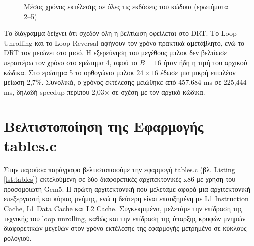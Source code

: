 \documentclass[12pt]{article}
\begin{document}
\begin{figure}[H]
\centering
{}
\caption{Μέσος χρόνος εκτέλεσης σε όλες τις εκδόσεις του κώδικα (ερωτήματα 2--5)}
\label{fig:summary}
\end{figure}

Το διάγραμμα δείχνει ότι σχεδόν όλη η βελτίωση οφείλεται στο DRT. Το Loop Unrolling και το Loop Reversal αφήνουν τον χρόνο πρακτικά αμετάβλητο, ενώ το DRT τον μειώνει στο μισό. Η εξερεύνηση του μεγέθους μπλοκ δεν βελτίωσε περαιτέρω τον χρόνο στο ερώτημα 4, αφού το $B = 16$ ήταν ήδη η τιμή του αρχικού κώδικα. Στο ερώτημα 5 το ορθογώνιο μπλοκ $24 \times 16$ έδωσε μια μικρή επιπλέον μείωση 2,7\%. Συνολικά, ο χρόνος εκτέλεσης μειώθηκε από 457,684 ms σε 225,444 ms, δηλαδή speedup περίπου 2,03$\times$ σε σχέση με τον αρχικό κώδικα.

\section{Βελτιστοποίηση της Εφαρμογής tables.c}
Στην παρούσα παράγραφο βελτιστοποιούμε την εφαρμογή tables.c (βλ. Listing \ref{lst:tables}) εκτελούμενη σε δύο διαφορετικές αρχιτεκτονικές x86 με χρήση του προσομοιωτή Gem5. Η πρώτη αρχιτεκτονική που μελετάμε αφορά μια αρχιτεκτονική επεξεργαστή και κύριας μνήμης, ενώ η δεύτερη είναι επαυξημένη με L1 Instruction Cache, L1 Data Cache και L2 Cache. Συγκεκριμένα, μελετάμε την επίδραση της τεχνικής του loop unrolling, καθώς και την επίδραση της ύπαρξης κρυφών μνημών διαφορετικών μεγεθών στον χρόνο εκτέλεσης της εφαρμογής μετρημένο σε κύκλους ρολογιού.
\end{document}
